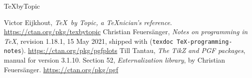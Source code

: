 \documentclass[11pt,a4paper]{article}
\begin{document}
\begin{thebibliography}{TeXbyTopic}\raggedright
   Victor Eijkhout, \textit{\TeX\ by Topic, a \TeX nician's reference}. \url{https://ctan.org/pkg/texbytopic}
   Christian Feuersänger, \textit{Notes on programming in \TeX}, revision 1.18.1, 15 May 2021, shipped with  (\texttt{texdoc TeX-programming-notes}). \url{https://ctan.org/pkg/pgfplots}
   Till Tantau, \textit{The Ti\textit{k}Z and PGF packages}, manual for version 3.1.10. Section 52, \textit{Externalization library}, by Christian Feuersänger. \url{https://ctan.org/pkg/pgf}
\end{thebibliography}

\revisiontable
\end{document}
